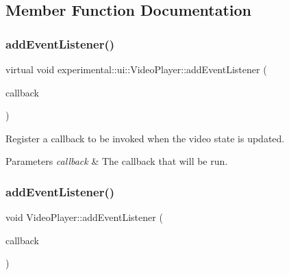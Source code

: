 \subsection{Member Function Documentation}
\mbox{\label{classexperimental_1_1ui_1_1VideoPlayer_a18d411ee29a29b32e965daf2934836da}} 
\subsubsection{\texorpdfstring{add\+Event\+Listener()}{addEventListener()}\hspace{0.1cm}{\footnotesize\ttfamily [1/2]}}
{\footnotesize\ttfamily virtual void experimental\+::ui\+::\+Video\+Player\+::add\+Event\+Listener (\begin{DoxyParamCaption}\item[{const \hyperlink{classexperimental_1_1ui_1_1VideoPlayer_a64ebf250429fec0efea303b13cecf02e}{Video\+Player\+::cc\+Video\+Player\+Callback} \&}]{callback }\end{DoxyParamCaption})\hspace{0.3cm}{\ttfamily [virtual]}}

Register a callback to be invoked when the video state is updated.


\begin{DoxyParams}{Parameters}
{\em callback} & The callback that will be run. \\
\hline
\end{DoxyParams}
\mbox{\label{classexperimental_1_1ui_1_1VideoPlayer_a5c8ddd1fd32da63de5c88bf0570b10df}} 
\subsubsection{\texorpdfstring{add\+Event\+Listener()}{addEventListener()}\hspace{0.1cm}{\footnotesize\ttfamily [2/2]}}
{\footnotesize\ttfamily void Video\+Player\+::add\+Event\+Listener (\begin{DoxyParamCaption}\item[{const \hyperlink{classexperimental_1_1ui_1_1VideoPlayer_a64ebf250429fec0efea303b13cecf02e}{Video\+Player\+::cc\+Video\+Player\+Callback} \&}]{callback }\end{DoxyParamCaption})\hspace{0.3cm}{\ttfamily [virtual]}}

